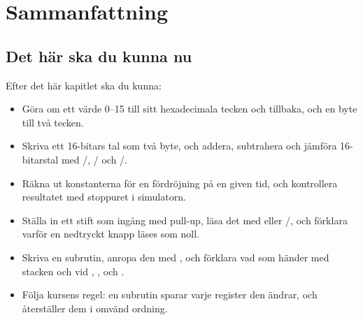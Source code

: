 
\section{Sammanfattning}
\label{c10:sec:summary}

\subsection*{Det här ska du kunna nu}
Efter det här kapitlet ska du kunna:
\begin{itemize}
  \item Göra om ett värde 0--15 till sitt hexadecimala tecken och tillbaka, och en byte till två
    tecken.
  \item Skriva ett 16-bitars tal som två byte, och addera, subtrahera och jämföra 16-bitarstal med
    /, / och /.
  \item Räkna ut konstanterna för en fördröjning på en given tid, och kontrollera resultatet med
    stoppuret i simulatorn.
  \item Ställa in ett stift som ingång med pull-up, läsa det med  eller
    /, och förklara varför en nedtryckt knapp läses som noll.
  \item Skriva en subrutin, anropa den med , och förklara vad som händer med stacken
    och  vid , ,  och .
  \item Följa kursens regel: en subrutin sparar varje register den ändrar, och återställer dem i
    omvänd ordning.
\end{itemize}

